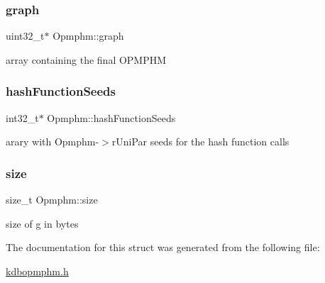 \subsubsection{\texorpdfstring{graph}{graph}}
{\footnotesize\ttfamily uint32\+\_\+t$\ast$ Opmphm\+::graph}

array containing the final O\+P\+M\+P\+HM \mbox{\label{structOpmphm_a522b3ab16ceb22828b54333868c9324d}} 
\subsubsection{\texorpdfstring{hash\+Function\+Seeds}{hashFunctionSeeds}}
{\footnotesize\ttfamily int32\+\_\+t$\ast$ Opmphm\+::hash\+Function\+Seeds}

arary with Opmphm-\/$>$r\+Uni\+Par seeds for the hash function calls \mbox{\label{structOpmphm_a72e7343b4ea87b27891e760f03fd2b96}} 
\subsubsection{\texorpdfstring{size}{size}}
{\footnotesize\ttfamily size\+\_\+t Opmphm\+::size}

size of g in bytes 

The documentation for this struct was generated from the following file\+:\begin{DoxyCompactItemize}
\item 
\hyperlink{kdbopmphm_8h}{kdbopmphm.\+h}\end{DoxyCompactItemize}

